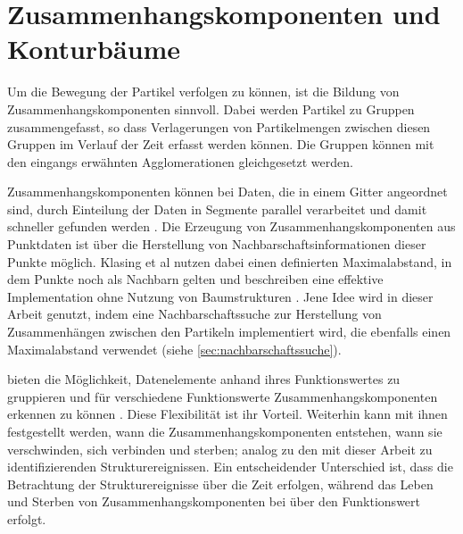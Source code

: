 

\section{Zusammenhangskomponenten und Konturbäume}\label{sec:related:connectedContour}

Um die Bewegung der Partikel verfolgen zu können, ist die Bildung von Zusammenhangskomponenten sinnvoll. Dabei werden Partikel zu Gruppen zusammengefasst, so dass Verlagerungen von Partikelmengen zwischen diesen Gruppen im Verlauf der Zeit erfasst werden können. Die Gruppen können mit den eingangs erwähnten Agglomerationen gleichgesetzt werden.

Zusammenhangskomponenten können bei Daten, die in einem Gitter angeordnet sind, durch Einteilung der Daten in Segmente parallel verarbeitet und damit schneller gefunden werden \cite{trevor2013efficient}. Die Erzeugung von Zusammenhangskomponenten aus Punktdaten ist über die Herstellung von Nachbarschaftsinformationen dieser Punkte möglich. Klasing et al nutzen dabei einen definierten Maximalabstand, in dem Punkte noch als Nachbarn gelten und beschreiben eine effektive Implementation ohne Nutzung von Baumstrukturen \cite{klasing2008efficientSegmentationOf3DLaserData}. %
Jene Idee wird in dieser Arbeit genutzt, indem eine Nachbarschaftssuche zur Herstellung von Zusammenhängen zwischen den Partikeln implementiert wird, die ebenfalls einen Maximalabstand verwendet (siehe \autoref{sec:nachbarschaftssuche}).

 bieten die Möglichkeit, Datenelemente anhand ihres Funktionswertes zu gruppieren und für verschiedene Funktionswerte Zusammenhangskomponenten erkennen zu können \cite{vanKreveld1997isosurfaceTraversal} \cite{bajaj1997contourSpectrum}. Diese Flexibilität ist ihr Vorteil. Weiterhin kann mit ihnen festgestellt werden, wann die Zusammenhangskomponenten entstehen, wann sie verschwinden, sich verbinden und sterben; analog zu den mit dieser Arbeit zu identifizierenden Strukturereignissen. Ein entscheidender Unterschied ist, dass die Betrachtung der Strukturereignisse über die Zeit erfolgen, während das Leben und Sterben von Zusammenhangskomponenten bei  über den Funktionswert erfolgt.

